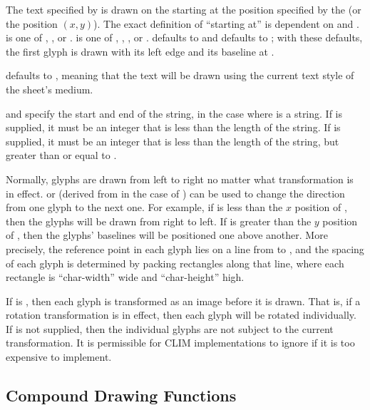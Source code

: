 The text specified by  is drawn on the 
 starting at the position specified by the  
(or the position $(x,y)$).  The exact definition of ``starting at'' is dependent
on  and .   is one of ,
, or .   is one of ,
, , or .   defaults to 
and  defaults to ; with these defaults, the first
glyph is drawn with its left edge and its baseline at .

 defaults to , meaning that the text will be drawn using
the current text style of the sheet's medium.

 and  specify the start and end of the string, in the case
where  is a string.  If  is supplied, it must be
an integer that is less than the length of the string.  If  is
supplied, it must be an integer that is less than the length of the string, but
greater than or equal to .

Normally, glyphs are drawn from left to right no matter what transformation is
in effect.   or  (derived from  in
the case of ) can be used to change the direction from one glyph
to the next one.  For example, if  is less than the $x$ position
of , then the glyphs will be drawn from right to left.  If
 is greater than the $y$ position of , then the glyphs'
baselines will be positioned one above another.  More precisely, the reference
point in each glyph lies on a line from  to , and
the spacing of each glyph is determined by packing rectangles along that line,
where each rectangle is ``char-width'' wide and ``char-height'' high.

If  is , then each glyph is transformed as an
image before it is drawn.  That is, if a rotation transformation is in effect,
then each glyph will be rotated individually.  If  is not
supplied, then the individual glyphs are not subject to the current
transformation.  It is permissible for CLIM implementations to ignore
 if it is too expensive to implement.


\subsection {Compound Drawing Functions}

